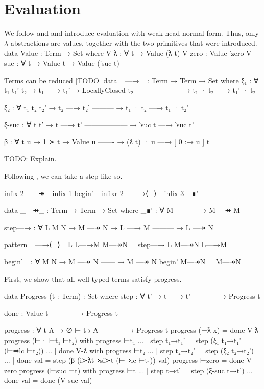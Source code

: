 \documentclass[logo,bsc,singlespacing,parskip,online]{infthesis}
\renewenvironment{code}{\mintedcopy[breaklines,breaksymbolleft=\;]{agda}}{\endmintedcopy}
\begin{document}
\section{Evaluation}
We follow \citet{wadler_programming_2022} and \citet{chargueraud_locally_2012} and introduce
evaluation with weak-head normal form. Thus, only $\lambda$-abstractions are values, together with
the two primitives that were introduced.
\begin{code}
data Value : Term → Set where
  V-ƛ : ∀ {t} → Value (ƛ t)
  V-zero : Value ‵zero
  V-suc : ∀ {t} → Value t → Value (‵suc t)
\end{code}

Terms can be reduced [TODO]
\begin{code}
data _—→_ : Term → Term → Set where
  ξ₁ : ∀ {t₁ t₁' t₂}
    → t₁ —→ t₁'
    → LocallyClosed t₂
      -------------------
    → t₁ · t₂ —→ t₁' · t₂

  ξ₂ : ∀ {t₁ t₂ t₂'}
    → t₂ —→ t₂'
      ---------
    → t₁ · t₂ —→ t₁ · t₂'

  ξ-suc : ∀ {t t'}
    → t —→ t'
      ------------------
    → ‵suc t —→ ‵suc t'

  β : ∀ {t u}
    → 1 ≻ t
    → Value u
      -------
    → (ƛ t) · u —→ [ 0 :→ u ] t
\end{code}

TODO: Explain.

Following \citet{wadler_programming_2022}, we can take a step like so.

\begin{code}
infix  2 _—↠_
infix  1 begin'_
infixr 2 _—→⟨_⟩_
infix  3 _∎'

data _—↠_ : Term → Term → Set where
  _∎' : ∀ M
      ---------
    → M —↠ M

  step—→ : ∀ L {M N}
    → M —↠ N
    → L —→ M
      ---------
    → L —↠ N

pattern _—→⟨_⟩_ L L—→M M—↠N = step—→ L M—↠N L—→M

begin'_ : ∀ {M N}
  → M —↠ N
    ------
  → M —↠ N
begin' M—↠N = M—↠N
\end{code}

First, we show that all well-typed terms satisfy progress.

\begin{code}
data Progress (t : Term) : Set where
  step : ∀ {t'}
    → t —→ t'
      ----------
    → Progress t

  done :
      Value t
      ----------
    → Progress t

progress : ∀ {t A}
  → ∅ ⊢ t ⦂ A
    ----------
  → Progress t
progress (⊢ƛ x) = done V-ƛ
progress (⊢· ⊢t₁ ⊢t₂) with progress ⊢t₁
... | step t₁→t₁' = step (ξ₁ t₁→t₁' (⊢⇒lc ⊢t₂))
... | done V-ƛ with progress ⊢t₂
...   | step t₂→t₂' = step (ξ₂ t₂→t₂')
...   | done val    = step (β (i≻ƛt⇒si≻t (⊢⇒lc ⊢t₁)) val)
progress ⊢zero = done V-zero
progress (⊢suc ⊢t) with progress ⊢t
... | step t→t' = step (ξ-suc t→t')
... | done val  = done (V-suc val)
\end{code}
\end{document}
